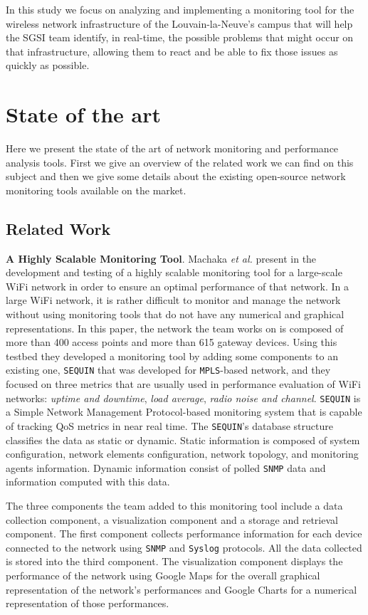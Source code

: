 In this study we focus on analyzing and implementing a monitoring tool for the wireless network infrastructure of the Louvain-la-Neuve's campus that will help the SGSI team identify, in real-time, the possible problems that might occur on that infrastructure, allowing them to react and be able to fix those issues as quickly as possible.


\section{State of the art}
Here we present the state of the art of network monitoring and performance analysis tools.
First we give an overview of the related work we can find on this subject and then we give some details about the existing open-source network monitoring tools available on the market.

\subsection{Related Work}

\textbf{A Highly Scalable Monitoring Tool}. Machaka \textit{et al.} present in \cite{article1} the development and testing of a highly scalable monitoring tool for a large-scale WiFi network in order to ensure an optimal performance of that network. In a large WiFi network, it is rather difficult to monitor and manage the network without using monitoring tools that do not have any numerical and graphical representations. In this paper, the network the team works on is composed of more than 400 access points and more than 615 gateway devices. Using this testbed they developed a monitoring tool by adding some components to an existing one, \texttt{SEQUIN} \cite{sequin} that was developed for \texttt{MPLS}-based network, and they focused on three metrics that are usually used in performance evaluation of WiFi networks: \textit{uptime and downtime}, \textit{load average}, \textit{radio noise and channel}. \texttt{SEQUIN} is a Simple Network Management Protocol-based monitoring system that is capable of tracking QoS metrics in near real time. The \texttt{SEQUIN}'s database structure classifies the data as static or dynamic. Static information is composed of system configuration, network elements configuration, network topology, and monitoring agents information. Dynamic information consist of polled \texttt{SNMP} data and information computed with this data. 

The three components the team added to this monitoring tool include a data collection component, a visualization component and a storage and retrieval component. The first component collects performance information for each device connected to the network using \texttt{SNMP} and \texttt{Syslog} protocols. All the data collected is stored into the third component. The visualization component displays the performance of the network using Google Maps for the overall graphical representation of the network's performances and Google Charts for a numerical representation of those performances.

